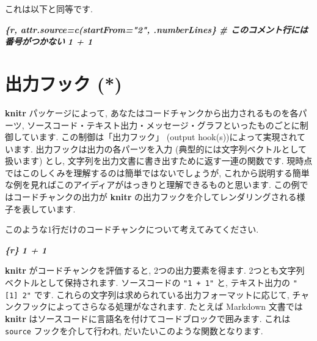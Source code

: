 \documentclass[
  11pt,
  lualatex,ja=standard,jafont=noto]{bxjsreport}
\newenvironment{Shaded}{\begin{snugshade}}{\end{snugshade}}
\newcommand{\InformationTok}[1]{\textcolor[rgb]{0.56,0.35,0.01}{\textbf{\textit{#1}}}}
\begin{document}
これは以下と同等です.

\begin{Shaded}
\begin{Highlighting}[]
\InformationTok{\textasciigrave{}\textasciigrave{}\textasciigrave{}\{r, attr.source=c(\textquotesingle{}startFrom="2"\textquotesingle{}, \textquotesingle{}.numberLines\textquotesingle{}\}}
\InformationTok{\# このコメント行には番号がつかない}
\InformationTok{1 + 1}
\InformationTok{\textasciigrave{}\textasciigrave{}\textasciigrave{}}
\end{Highlighting}
\end{Shaded}

\hypertarget{output-hooks}{%
\chapter{出力フック (*)}\label{output-hooks}}

\textbf{knitr} パッケージによって, あなたはコードチャンクから出力されるものを各パーツ, ソースコード・テキスト出力・メッセージ・グラフといったものごとに制御しています. この制御は「出力フック」 (output hook(s))によって実現されています. 出力フックは出力の各パーツを入力 (典型的には文字列ベクトルとして扱います) とし, 文字列を出力文書に書き出すために返す一連の関数です. 現時点ではこのしくみを理解するのは簡単ではないでしょうが, これから説明する簡単な例を見ればこのアイディアがはっきりと理解できるものと思います. この例ではコードチャンクの出力が \textbf{knitr} の出力フックを介してレンダリングされる様子を表しています.

このような1行だけのコードチャンクについて考えてみてください.

\begin{Shaded}
\begin{Highlighting}[]
\InformationTok{\textasciigrave{}\textasciigrave{}\textasciigrave{}\{r\}}
\InformationTok{1 + 1}
\InformationTok{\textasciigrave{}\textasciigrave{}\textasciigrave{}}
\end{Highlighting}
\end{Shaded}

\textbf{knitr} がコードチャンクを評価すると, 2つの出力要素を得ます. 2つとも文字列ベクトルとして保持されます. ソースコードの \texttt{"1 + 1"} と, テキスト出力の \texttt{"{[}1{]}\ 2"} です. これらの文字列は求められている出力フォーマットに応じて, チャンクフックによってさらなる処理がなされます. たとえば Markdown 文書では \textbf{knitr} はソースコードに言語名を付けてコードブロックで囲みます. これは \texttt{source} フックを介して行われ, だいたいこのような関数となります.
\end{document}
